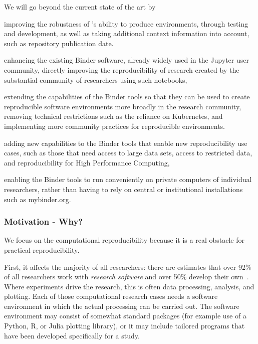 We will go beyond the current state of the art by
\begin{compactitem}
\item improving the robustness of \repotodocker{}'s ability to produce environments,
      through testing and development, as well as taking additional context information into account,
      such as repository publication date.
\item enhancing the existing Binder software, already widely used in the Jupyter user community,
  directly improving the reproducibility of research created by the substantial
  community of researchers using such notebooks,
\item extending the capabilities of the Binder tools so that they can be used to
  create reproducible software environments more broadly in the research community,
  removing technical restrictions such as the reliance on Kubernetes,
  and implementing more community practices for reproducible environments.
\item adding new capabilities to the Binder tools that enable new reproducibility
  use cases, such as those that need access to large data sets, access to restricted data,
  and reproducibility for High Performance Computing,
\item enabling the Binder tools to run conveniently on private computers of individual
  researchers, rather than having to rely on central or institutional
  installations such as mybinder.org.
\end{compactitem}

\subsubsection{Motivation - Why?}\label{sec:motivation-why}

We focus on the computational reproducibility because it is a real
obstacle for practical reproducibility.

First, it affects the majority of all researchers: there are estimates that over
92\% of all researchers work with \emph{research software} and over 50\% develop
their own~\cite{Hettrick2014}. Where experiments drive the research, this is
often data processing, analysis, and plotting. Each of those computational
research cases needs a software environment in which the actual processing can
be carried out. The software environment may consist of somewhat standard
packages (for example use of a Python, R, or Julia plotting library), or it may
include tailored programs that have been developed specifically for a study.

